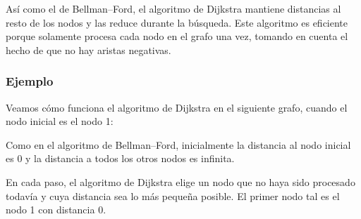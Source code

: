 Así como el de Bellman--Ford, el algoritmo de Dijkstra
mantiene distancias al resto de los nodos y las reduce durante la
búsqueda. Este algoritmo es eficiente porque solamente procesa
cada nodo en el grafo una vez, tomando en cuenta el hecho de que
no hay aristas negativas.

\subsubsection{Ejemplo}

Veamos cómo funciona el algoritmo de Dijkstra en el siguiente
grafo, cuando el nodo inicial es el nodo 1:
\begin{center}
\end{center}

Como en el algoritmo de Bellman--Ford, inicialmente la distancia
al nodo inicial es 0 y la distancia a todos los otros nodos es infinita.

En cada paso, el algoritmo de Dijkstra elige un nodo que no haya
sido procesado todavía y cuya distancia sea lo más pequeña posible.
El primer nodo tal es el nodo 1 con distancia 0.

